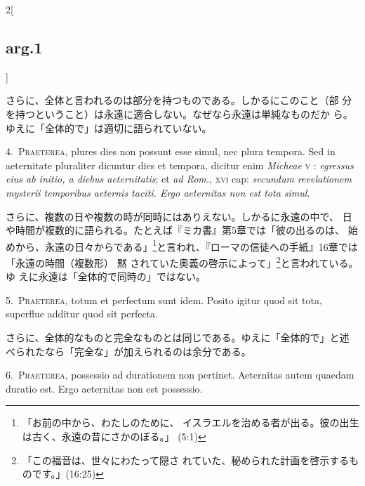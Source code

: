 \documentclass[paper=a4paper,fontsize=10pt,jafontsize=9pt,titlepage]{jlreq}
\begin{document}
\begin{paracol}{2}[\subsection{arg.1}]
\switchcolumn

さらに、全体と言われるのは部分を持つものである。しかるにこのこと（部
分を持つということ）は永遠に適合しない。なぜなら永遠は単純なものだか
ら。ゆえに「全体的で」は適切に語られていない。


4.~{\scshape Praeterea}, plures dies non possunt esse simul, nec plura
tempora. Sed in aeternitate pluraliter dicuntur dies et tempora, dicitur
enim {\itshape Micheae} {\scshape v} : {\itshape egressus eius ab initio, a
diebus aeternitatis}; et {\itshape ad Rom.}, {\scshape xvi} cap: {\itshape
secundum revelationem mysterii temporibus aeternis taciti. Ergo
aeternitas non est tota simul}.

\switchcolumn

さらに、複数の日や複数の時が同時にはありえない。しかるに永遠の中で、
日や時間が複数的に語られる。たとえば『ミカ書』第5章では「彼の出るのは、
始めから、永遠の日々からである」\footnote{「お前の中から、わたしのために、
イスラエルを治める者が出る。彼の出生は古く、永遠の昔にさかのぼる。」
(5:1)}と言われ、『ローマの信徒への手紙』16章では「永遠の時間（複数形） 黙
されていた奥義の啓示によって」\footnote{「この福音は、世々にわたって隠さ
れていた、秘められた計画を啓示するものです。」(16:25)}と言われている。ゆ
えに永遠は「全体的で同時の」ではない。


5.~{\scshape Praeterea}, totum et perfectum sunt idem. Posito igitur quod sit
tota, superflue additur quod sit perfecta.

\switchcolumn

さらに、全体的なものと完全なものとは同じである。ゆえに「全体的で」と述
べられたなら「完全な」が加えられるのは余分である。


6.~{\scshape Praeterea}, possessio ad durationem non pertinet. Aeternitas autem
quaedam duratio est. Ergo aeternitas non est possessio.


\end{paracol}
\end{document}
